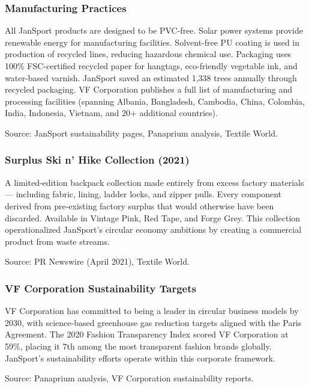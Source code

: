 \documentclass[11pt,letterpaper]{article}
\begin{document}
\subsubsection{Manufacturing Practices}

All JanSport products are designed to be PVC-free. Solar power systems provide renewable energy for manufacturing facilities. Solvent-free PU coating is used in production of recycled lines, reducing hazardous chemical use. Packaging uses 100\% FSC-certified recycled paper for hangtags, eco-friendly vegetable ink, and water-based varnish. JanSport saved an estimated 1,338 trees annually through recycled packaging. VF Corporation publishes a full list of manufacturing and processing facilities (spanning Albania, Bangladesh, Cambodia, China, Colombia, India, Indonesia, Vietnam, and 20+ additional countries).

Source: JanSport sustainability pages, Panaprium analysis, Textile World.

\subsubsection{Surplus Ski n' Hike Collection (2021)}

A limited-edition backpack collection made entirely from excess factory materials --- including fabric, lining, ladder locks, and zipper pulls. Every component derived from pre-existing factory surplus that would otherwise have been discarded. Available in Vintage Pink, Red Tape, and Forge Grey. This collection operationalized JanSport's circular economy ambitions by creating a commercial product from waste streams.

Source: PR Newswire (April 2021), Textile World.

\subsubsection{VF Corporation Sustainability Targets}

VF Corporation has committed to being a leader in circular business models by 2030, with science-based greenhouse gas reduction targets aligned with the Paris Agreement. The 2020 Fashion Transparency Index scored VF Corporation at 59\%, placing it 7th among the most transparent fashion brands globally. JanSport's sustainability efforts operate within this corporate framework.

Source: Panaprium analysis, VF Corporation sustainability reports.
\end{document}
